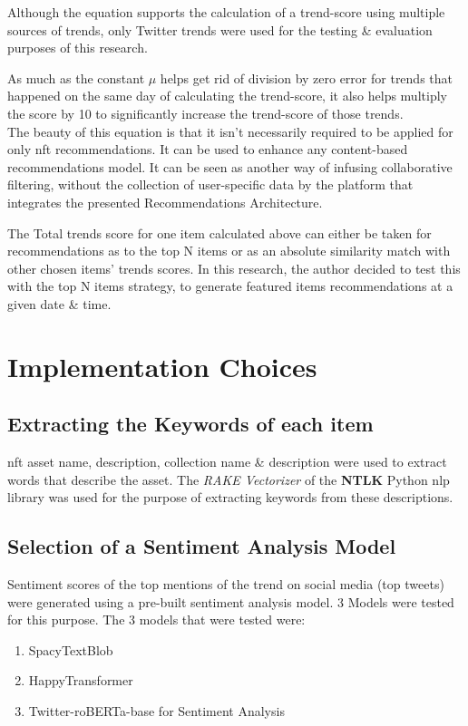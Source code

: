\documentclass[manuscript,natbib=false]{acmart}
\begin{document}


Although the equation supports the calculation of a trend-score using multiple sources of trends, only Twitter trends were used for the testing \& evaluation purposes of this research. 

As much as the constant $\mu$ helps get rid of division by zero error for trends that happened on the same day of calculating the trend-score, it also helps multiply the score by 10 to significantly increase the trend-score of those trends.\\

The beauty of this equation is that it isn't necessarily required to be applied for only \gls{nft} recommendations. It can be used to enhance any content-based recommendations model. It can be seen as another way of infusing collaborative filtering, without the collection of user-specific data by the platform that integrates the presented Recommendations Architecture.

The Total trends score for one item calculated above can either be taken for recommendations as to the top N items or as an absolute similarity match with other chosen items' trends scores. In this research, the author decided to test this with the top N items strategy, to generate featured items recommendations at a given date \& time.

\section{Implementation Choices}

\subsection{Extracting the Keywords of each item}
\gls{nft} asset name, description, collection name \& description were used to extract words that describe the asset. The \textit{RAKE Vectorizer} of the \textbf{NTLK} Python \gls{nlp} library was used for the purpose of extracting keywords from these descriptions.

\subsection{Selection of a Sentiment Analysis Model}
Sentiment scores of the top mentions of the trend on social media (top tweets) were generated using a pre-built sentiment analysis model. 3 Models were tested for this purpose. The 3 models that were tested were:
\begin{enumerate}
\item SpacyTextBlob
\item HappyTransformer
\item Twitter-roBERTa-base for Sentiment Analysis
\end{enumerate}
\end{document}
